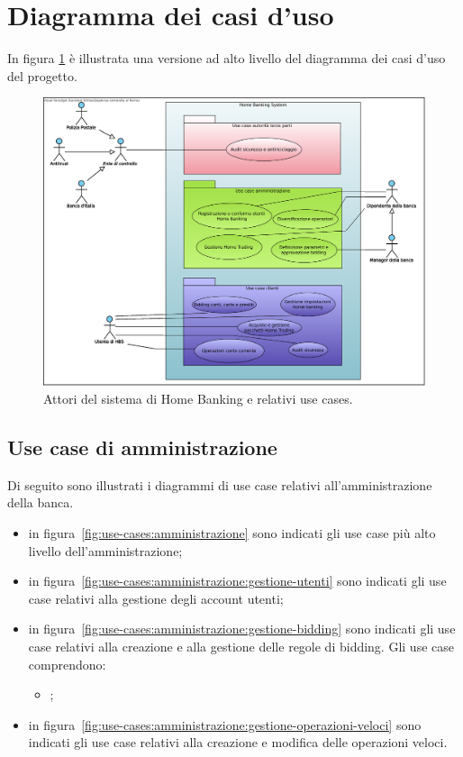 \section{Diagramma dei casi d'uso}

In figura \ref{fig:use-cases} \`e illustrata una versione ad alto livello del diagramma dei casi d'uso del progetto.

\begin{figure}
	\centering
	\includegraphics[width=\textwidth]{Images/Home_Banking_inception_use_cases.eps}
	\caption{Attori del sistema di Home Banking e relativi use cases.}
	\label{fig:use-cases}
\end{figure}

\subsection{Use case di amministrazione}

Di seguito sono illustrati i diagrammi di use case relativi all'amministrazione della banca.

\begin{itemize}
	\item in figura~\ref{fig:use-cases:amministrazione} sono indicati gli use case più alto livello dell'amministrazione;

	\item in figura~\ref{fig:use-cases:amministrazione:gestione-utenti} sono indicati gli use case relativi alla gestione degli account utenti;

	\item in figura~\ref{fig:use-cases:amministrazione:gestione-bidding} sono indicati gli use case relativi alla creazione e alla gestione delle regole di bidding.
	Gli use case comprendono:
	\begin{itemize}
		\item \hyperref[sec:use-case:BIDVIS]{\iducBIDVIS};
	\end{itemize}

	\item in figura~\ref{fig:use-cases:amministrazione:gestione-operazioni-veloci} sono indicati gli use case relativi alla creazione e modifica delle operazioni veloci.
\end{itemize}

